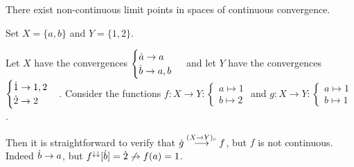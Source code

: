 \begin{example}
There exist non-continuous limit points in spaces of continuous convergence.

Set $X = \{a,b\}$ and $Y = \{1,2\}$.

Let $X$ have the convergences $\begin{cases}
\dot{a} \to a \\
\dot{b} \to a,b
\end{cases}$ and let $Y$ have the convergences $\begin{cases}
\dot{1} \to 1,2 \\
\dot{2} \to 2
\end{cases}$.
Consider the functions $f: X\to Y: \begin{cases}
a\mapsto 1 \\ b\mapsto 2
\end{cases}$ and $g: X\to Y: \begin{cases}
a\mapsto 1 \\ b\mapsto 1
\end{cases}$.

Then it is straightforward to verify that $\dot{g} \overset{(X\to Y)_c}{\longrightarrow} f$, but $f$ is not continuous. Indeed $\dot{b} \to a$, but $f^{\downarrow\downarrow}[\dot{b}] = \dot{2} \not\to f(a) = 1$.
\end{example}

